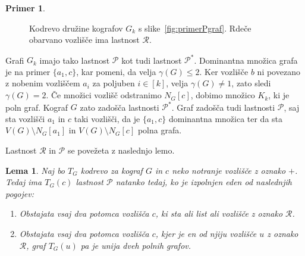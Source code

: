 \documentclass[12pt,a4paper,twoside]{article}
\theoremstyle{definition} %
\newtheorem{primer}[definicija]{Primer}
\theoremstyle{plain} %
\newtheorem{lema}[definicija]{Lema}
\numberwithin{equation}{section}  %
\begin{document}
\begin{primer}
\begin{figure}[h]
\begin{tikzpicture}[main_node/.style={circle,draw,inner sep=3pt,minimum size = 0.9cm, scale=0.8}]
\end{tikzpicture}
\caption{Kodrevo družine kografov $G_k$ s slike~\ref{fig:primerPgraf}. Rdeče obarvano vozlišče ima lastnost $\mathcal{R}$.}
\label{fig:primerPdrevo}
\end{figure}

Grafi $G_k$ imajo tako lastnost $\mathcal{P}$ kot tudi lastnost $\mathcal{P^*}$. Dominantna množica grafa je na primer $\{a_1, c\}$, kar pomeni, da velja $\gamma(G) \leq 2$. Ker vozlišče $b$ ni povezano z nobenim vozliščem $a_i$ za poljuben $i \in [k]$, velja $\gamma(G) \neq 1$, zato sledi $\gamma(G) = 2$. Če množici vozlišč odstranimo $N_G[c]$, dobimo množico $K_k$, ki je poln graf. Kograf $G$ zato zadošča lastnosti  $\mathcal{P^*}$. 
Graf zadošča tudi lastnosti $\mathcal{P}$, saj sta vozlišči $a_1$ in $c$ taki vozlišči, da je $\{a_1, c\}$ dominantna množica ter da sta $V(G) \setminus N_G[a_1]$  in $V(G) \setminus N_G[c]$ polna grafa.
\end{primer}


Lastnost $\mathcal{R}$ in $\mathcal{P}$ se povežeta z naslednjo lemo.

\begin{lema}\label{Lema2} Naj bo $T_G$ kodrevo za kograf $G$ in $c$ neko notranje vozlišče z oznako $+$. Tedaj ima $T_G(c)$ lastnost $\mathcal{P}$ natanko tedaj, ko je izpolnjen eden od naslednjih pogojev:
\begin{enumerate}[label=($\roman*$)]
\item Obstajata vsaj dva potomca vozlišča $c$, ki sta ali list ali vozlišče z oznako $\mathcal{R}$.
\item Obstajata vsaj dva potomca vozlišča $c$, kjer je en od njiju vozlišče $u$ z oznako $\mathcal{R}$, graf $T_G(u)$ pa je unija dveh polnih grafov.
\end{enumerate}
\end{lema}
\end{document}
